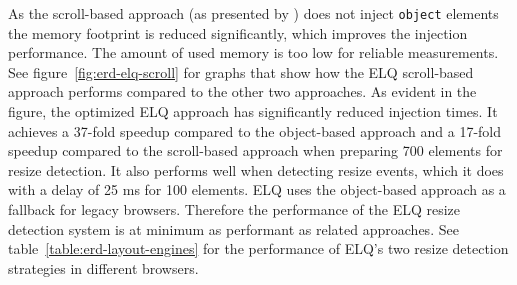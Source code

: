\documentclass{llncs}
\newcommand{\code}[1]{\texttt{#1}}
\newcommand{\elq}{ELQ}
\begin{document}
\begin{figure*}[h]
\begin{center}
\begin{minipage}[t]{.5\textwidth}
        \end{minipage}
      \caption{The left graph shows the injection time of the \elq{} scroll-based approach. The right graph shows all three approaches, including graph predictions by polynomial regression.}
      \label{fig:erd-elq-scroll}
      \end{center}
    \end{figure*}

    \noindent
    As the scroll-based approach (as presented by \cite{backalley}) does not inject \code{object} elements the memory footprint is reduced significantly, which improves the injection performance.
    The amount of used memory is too low for reliable measurements.
    See figure~\ref{fig:erd-elq-scroll} for graphs that show how the \elq{} scroll-based approach performs compared to the other two approaches.
    As evident in the figure, the optimized \elq{} approach has significantly reduced injection times.
    It achieves a 37-fold speedup compared to the object-based approach and a 17-fold speedup compared to the scroll-based approach when preparing 700 elements for resize detection.
    It also performs well when detecting resize events, which it does with a delay of 25 ms for 100 elements.
    \newline\indent
    \elq{} uses the object-based approach as a fallback for legacy browsers.
    Therefore the performance of the \elq{} resize detection system is at minimum as performant as related approaches.
    See table~\ref{table:erd-layout-engines} for the performance of \elq{}'s two resize detection strategies in different browsers.
\end{document}

